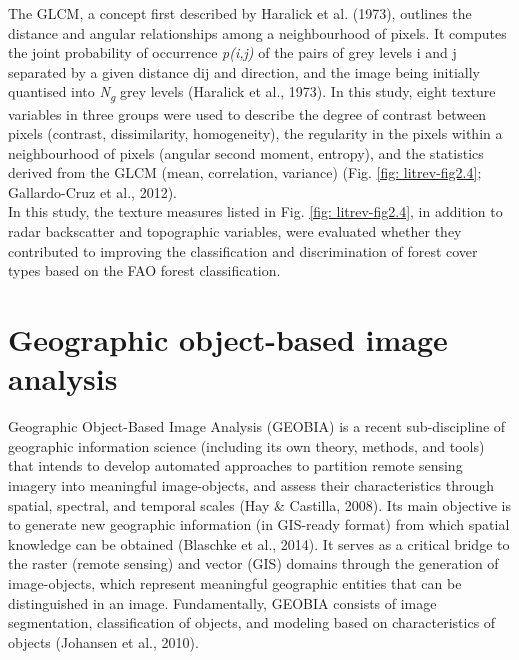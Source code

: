 The GLCM, a concept first described by Haralick et al. (1973), outlines the distance and angular relationships among a neighbourhood of pixels. It computes the joint probability of occurrence \textit{p(i,j)} of the pairs of grey levels i and j separated by a given distance dij and direction, and the image being initially quantised into \textit{N\textsubscript{g}} grey levels (Haralick et al., 1973). In this study, eight texture variables in three groups were used to describe the degree of contrast between pixels (contrast, dissimilarity, homogeneity), the regularity in the pixels within a neighbourhood of pixels (angular second moment, entropy), and the statistics derived from the GLCM (mean, correlation, variance) (Fig. \ref{fig: litrev-fig2.4}; Gallardo-Cruz et al., 2012).\\

In this study, the texture measures listed in Fig. \ref{fig: litrev-fig2.4}, in addition to radar backscatter and topographic variables, were evaluated whether they contributed to improving the classification and discrimination of forest cover types based on the FAO forest classification.

\section{Geographic object-based image analysis}
\label{sec: litrev-geobia}

Geographic Object-Based Image Analysis (GEOBIA) is a recent sub-discipline of geographic information science (including its own theory, methods, and tools) that intends to develop automated approaches to partition remote sensing imagery into meaningful image-objects, and assess their characteristics through spatial, spectral, and temporal scales (Hay \& Castilla, 2008). Its main objective is to generate new geographic information (in GIS-ready format) from which spatial knowledge can be obtained (Blaschke et al., 2014). It serves as a critical bridge to the raster (remote sensing) and vector (GIS) domains through the generation of image-objects, which represent meaningful geographic entities that can be distinguished in an image. Fundamentally, GEOBIA consists of image segmentation, classification of objects, and modeling based on characteristics of objects (Johansen et al., 2010).

